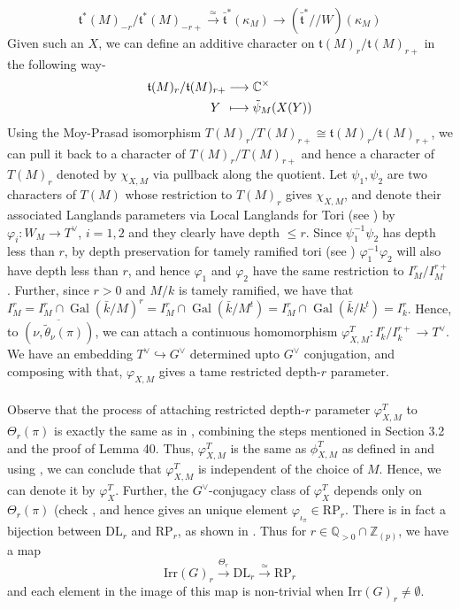 \documentclass[11 pt]{article}
\numberwithin{equation}{subsection}
\theoremstyle{definition}
\theoremstyle{remark}
\theoremstyle{conjecture}
\DeclareMathOperator{\Gal}{Gal}
\newcommand{\ft}{\mathfrak t}
\newcommand{\bt}{\bar{\mathfrak t}}
\newcommand{\Irr}{\mathrm{Irr}}
\newcommand{\DL}{\mathrm{DL}}
\newcommand{\Z}{\mathbb Z}
\newcommand{\Q}{\mathbb Q}
\newcommand{\C}{\mathbb C}
\begin{document}
 \[
\ft^*(M)_{-r}/ \ft^*(M)_{-r+} \xrightarrow{\simeq}\bt^*(\kappa_M) \rightarrow(\bt^*//W)(\kappa_M) 
 \]
Given such an $X$, we can define an additive character on $\ft(M)_r/\ft(M)_{r+}$ in the following way-
\begin{align*}
   \ft(M)_r/\ft(M)_{r+}& \longrightarrow\C^{\times} \\
   Y\:\:&\longmapsto \Tilde{\psi}_M(X(Y))
\end{align*}
Using the Moy-Prasad isomorphism $T(M)_r/T(M)_{r+} \cong \ft(M)_r/\ft(M)_{r+}$, we can pull it back to a character of $T(M)_r/T(M)_{r+}$ and hence a character of $T(M)_r$ denoted by $\chi_{X,M}$ via pullback along the quotient. Let $\psi_1,\psi_2$ are two characters of $T(M)$ whose restriction to $T(M)_r$ gives $\chi_{X,M}$, and denote their associated Langlands parameters via Local Langlands for Tori (see \cite[Section7.5]{Yutori}) by $\varphi_i:W_M\rightarrow T^\vee$, $i=1,2$ and they clearly have depth $\leq r$. Since $\psi_1^{-1}\psi_2$ has depth less than $r$, by depth preservation for tamely ramified tori (see \cite [Section 7.10]{Yutori}) $\varphi_1^{-1}\varphi_2$ will also have depth less than $r$, and hence $\varphi_1$ and $\varphi_2$ have the same restriction to $I_M^r/I_M^{r+}$. Further, since $r>0$ and $M/k$ is tamely ramified, we have that $I_M^r= I_M^r\cap \Gal(\bar k/M)^r=I^r_M\cap \Gal(\bar k/ M^t)= I^r_M \cap \Gal(\bar k/k^t)=I_k^r$. Hence, to $\overline{(\nu,\tilde\theta_\nu(\pi))}$, we can attach a continuous homomorphism $\varphi^T_{X,M}:I_k^r/I_k^{r+} \rightarrow T^\vee$. We have an embedding $T^\vee \hookrightarrow G^\vee$ determined upto $G^\vee$ conjugation, and composing with that, $\varphi_{X,M}$ gives a tame restricted depth-$r$ parameter.\paragraph{}

Observe that the process of attaching restricted depth-$r$ parameter $\varphi^T_{X,M}$ to $\Theta_r(\pi)$ is exactly the same as in \cite{chendebackertsai}, combining the steps mentioned in Section 3.2 and the proof of Lemma 40. Thus, $\varphi^T_{X,M}$ is the same as $\phi^T_{X,M}$ as defined in \cite[Section 5.1]{chendebackertsai} and using \cite[Corollary 19]{chendebackertsai}, we can conclude that $\varphi^T_{X,M}$ is independent of the choice of $M$. Hence, we can denote it by $\varphi^T_X$. Further, the $G^\vee$-conjugacy class of $\varphi_X^T$ depends only on $\Theta_r(\pi)$ (check \cite[Lemma 41]{chendebackertsai}, and hence gives an unique element $\varphi_{\iota_\pi}\in \mathrm{RP}_r$. There is in fact a bijection between $\mathrm{DL}_r$ and $\mathrm{RP}_r$, as shown in \cite[Lemma 45]{chendebackertsai}. Thus for $r \in \Q_{>0}\cap \Z_{(p)}$, we have a map 
\begin{equation*}
    \Irr(G)_r \xrightarrow{\Theta_r} \DL_r\xrightarrow{\simeq} \mathrm{RP}_r
\end{equation*}
and each element in the image of this map is non-trivial when $\Irr(G)_r \neq \emptyset$. \par
\end{document}
